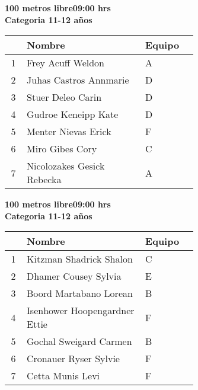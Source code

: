\begin{minipage}{0.95\linewidth}\vspace{0.5cm} 
\begin{flushleft}
\textbf{
\hspace{-0.15cm}100 metros libre\hspace{1.5cm}09:00 hrs \\Categoria 11-12 años}\vspace{-0.2cm} 
\end{flushleft}
\begin{tabular}{cp{0.63\linewidth}l}
\hline
& \textbf{Nombre} & \textbf{Equipo} \\ \hline
1 & Frey Acuff Weldon & A \\ 
2 & Juhas Castros Annmarie & D \\ 
3 & Stuer Deleo Carin & D \\ 
4 & Gudroe Keneipp Kate & D \\ 
5 & Menter Nievas Erick & F \\ 
6 & Miro Gibes Cory & C \\ 
7 & Nicolozakes Gesick Rebecka & A \\ 
\end{tabular}
\end{minipage}
\begin{minipage}{0.95\linewidth}\vspace{0.5cm} 
\begin{flushleft}
\textbf{
\hspace{-0.15cm}100 metros libre\hspace{1.5cm}09:00 hrs \\Categoria 11-12 años}\vspace{-0.2cm} 
\end{flushleft}
\begin{tabular}{cp{0.63\linewidth}l}
\hline
& \textbf{Nombre} & \textbf{Equipo} \\ \hline
1 & Kitzman Shadrick Shalon & C \\ 
2 & Dhamer Cousey Sylvia & E \\ 
3 & Boord Martabano Lorean & B \\ 
4 & Isenhower Hoopengardner Ettie & F \\ 
5 & Gochal Sweigard Carmen & B \\ 
6 & Cronauer Ryser Sylvie & F \\ 
7 & Cetta Munis Levi & F \\ 
\end{tabular}
\end{minipage}
